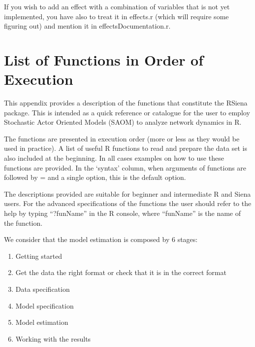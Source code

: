 \documentclass[a4paper,fleqn,11pt]{article}
\newcommand{\+}{\, + \,}
\newcommand{\sfn}[1]{\textsf{#1}}
\newcommand{\R}{{\sf R }}
\newcommand{\Rn}{{\sf R}}
\newcommand{\RS}{{\sf RSiena }}
\begin{document}
If you wish to add an effect with a combination of variables that is not yet implemented,
you have also to treat it in \sfn{effects.r} (which will require some figuring out) and
mention it in \sfn{effectsDocumentation.r}.


\appendix
\newpage
\section{List of Functions in Order of Execution}

    This appendix
    provides a description of the functions that constitute the
    \RS package. This is intended as a quick reference or catalogue for the
    user to employ Stochastic Actor Oriented Models (SAOM) to analyze network
    dynamics in \Rn.

    The functions are presented in execution order (more or less as
    they would be used in practice). A list of useful \R
    functions to read and prepare the data set is also included at the
    beginning. In all cases examples on how to use these functions are provided.
    In the `syntax' column,
    when arguments of functions are followed by = and a single option,
    this is the default option.

    The descriptions provided are suitable for beginner and intermediate \R and
    Siena users. For the advanced specifications of the functions the user
    should refer to the help by typing ``?funName'' in the \R console, where
    ``funName'' is the name of the function.

    We consider that the model estimation is composed by 6 stages:
\begin{enumerate}
    \item Getting started
    \item Get the data the right format or check that it is in the correct
      format
    \item Data specification
    \item Model specification
    \item   Model estimation
    \item   Working with the results
\end{enumerate}
\end{document}
